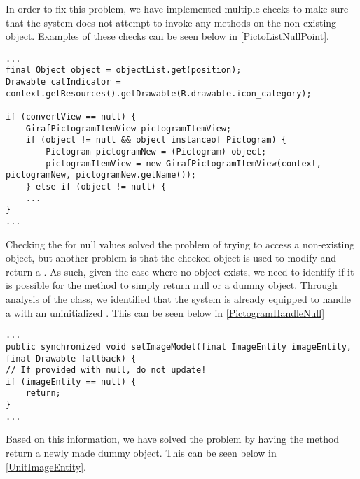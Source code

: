 In order to fix this problem, we have implemented multiple checks to make sure
that the system does not attempt to invoke any methods on the non-existing
object. Examples of these checks can be seen below in
\autoref{PictoListNullPoint}.\nl

\begin{minipage}[H]{\linewidth}
\begin{lstlisting}[caption = Newly implemented check for null values., label = PictoListNullPoint] 
...
final Object object = objectList.get(position);
Drawable catIndicator = context.getResources().getDrawable(R.drawable.icon_category);

if (convertView == null) {
	GirafPictogramItemView pictogramItemView;
    if (object != null && object instanceof Pictogram) {
    	Pictogram pictogramNew = (Pictogram) object;
        pictogramItemView = new GirafPictogramItemView(context, pictogramNew, pictogramNew.getName());
	} else if (object != null) {
	...
}
...
\end{lstlisting}
\end{minipage}

Checking the  for null values solved the problem of trying to
access a non-existing object, but another problem is that the checked object is used to
modify and return a . As such, given the case where no
object exists, we need to identify if it is possible for the method to simply
return null or a dummy object. Through analysis of the
 class, we identified that the system is already
equipped to handle a  with an uninitialized
. This can be seen below in \autoref{PictogramHandleNull}\nl

\begin{minipage}[H]{\linewidth}
\begin{lstlisting}[caption = \textc{setImageModel} method in the \textc{GirafPictogramItemView class.}, label = PictogramHandleNull] 
...
public synchronized void setImageModel(final ImageEntity imageEntity, final Drawable fallback) {
// If provided with null, do not update!
if (imageEntity == null) {
	return;
}
...
\end{lstlisting}
\end{minipage}

Based on this information, we have solved the problem by having the
 method return a newly made dummy object. This can be seen below
in \autoref{UnitImageEntity}.\nl

